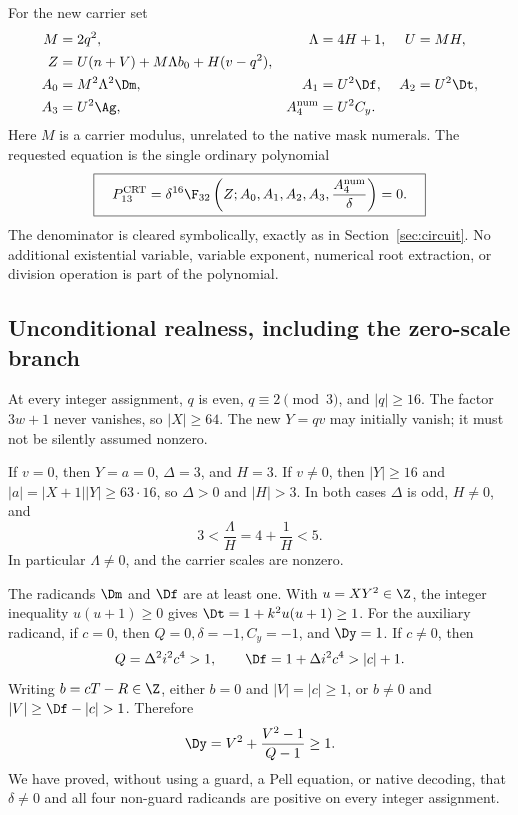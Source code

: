 For the new carrier set
\begin{align}
M&=2q^2,&\Lambda&=4H+1,&U&=MH,\nonumber\\
Z&=U(n+V)+M\Lambda b_0+H(v-q^2),\nonumber\\
A_0&=M^2\Lambda^2\Dm,&A_1&=U^2\Df,&A_2&=U^2\Dt,\nonumber\\
A_3&=U^2\Ag,&A_4^{\rm num}&=U^2C_y.
\label{eq:crtcarrier}
\end{align}
Here \(M\) is a carrier modulus, unrelated to the native mask numerals.
The requested equation is the single ordinary polynomial
\begin{equation}
\boxed{\quad
P_{13}^{\rm CRT}
=\delta^{16}\F_{32}\left(
Z;A_0,A_1,A_2,A_3,\frac{A_4^{\rm num}}{\delta}
\right)=0.
\quad}
\label{eq:crtpolynomial}
\end{equation}
The denominator is cleared symbolically, exactly as in
Section~\ref{sec:circuit}. No additional existential variable, variable
exponent, numerical root extraction, or division operation is part of
the polynomial.

\subsection{Unconditional realness, including the zero-scale branch}

At every integer assignment, \(q\) is even,
\(q\equiv2\pmod3\), and \(|q|\ge16\). The factor \(3w+1\)
never vanishes, so \(|X|\ge64\). The new \(Y=qv\) may initially
vanish; it must not be silently assumed nonzero.

If \(v=0\), then \(Y=a=0\), \(\Delta=3\), and \(H=3\).
If \(v\ne0\), then \(|Y|\ge16\) and
\(|a|=|X+1||Y|\ge63\cdot16\), so \(\Delta>0\) and
\(|H|>3\). In both cases \(\Delta\) is odd, \(H\ne0\), and
\begin{equation}
3<\frac{\Lambda}{H}=4+\frac1H<5.
\label{eq:crtlambda}
\end{equation}
In particular \(\Lambda\ne0\), and the carrier scales are nonzero.

The radicands \(\Dm\) and \(\Df\) are at least one. With
\(u=XY^2\in\Z\), the integer inequality \(u(u+1)\ge0\) gives
\(\Dt=1+k^2u(u+1)\ge1\). For the auxiliary radicand, if \(c=0\),
then \(Q=0,\delta=-1,C_y=-1\), and \(\Dy=1\). If \(c\ne0\),
then
\[
Q=\Delta^2i^2c^4>1,\qquad \Df=1+\Delta i^2c^4>|c|+1.
\]
Writing \(b=cT-R\in\Z\), either \(b=0\) and \(|V|=|c|\ge1\),
or \(b\ne0\) and \(|V|\ge\Df-|c|>1\). Therefore
\[
\Dy=V^2+\frac{V^2-1}{Q-1}\ge1.
\]
We have proved, without using a guard, a Pell equation, or native
decoding, that \(\delta\ne0\) and all four non-guard radicands are
positive on every integer assignment.

